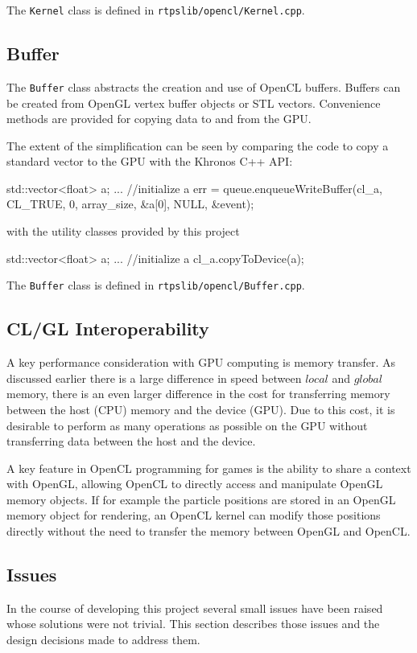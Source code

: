 The \verb|Kernel| class is defined in \verb|rtpslib/opencl/Kernel.cpp|.


\subsection{Buffer}

The \verb|Buffer| class abstracts the creation and use of OpenCL buffers.
Buffers can be created from OpenGL vertex buffer objects or STL vectors.
Convenience methods are provided for copying data to and from the GPU.

The extent of the simplification can be seen by comparing the code to copy a
standard vector to the GPU with the Khronos C++ API:
\begin{cppcode}{0}
     std::vector<float> a; 
     ... //initialize a 
     err = queue.enqueueWriteBuffer(cl_a, CL_TRUE, 0, array_size, &a[0], NULL, 
         &event);
\end{cppcode}

with the utility classes provided by this project
\begin{cppcode}{0}
    std::vector<float> a; 
     ... //initialize a 
    cl_a.copyToDevice(a);
\end{cppcode}


The \verb|Buffer| class is defined in \verb|rtpslib/opencl/Buffer.cpp|.


\subsection{CL/GL Interoperability}
A key performance consideration with GPU computing is memory transfer. As
discussed earlier there is a large difference in speed between $local$ and $global$
memory, there is an even larger difference in the cost for transferring memory
between the host (CPU) memory and the device (GPU). Due to this cost, it is
desirable to perform as many operations as possible on the GPU without
transferring data between the host and the device.


A key feature in OpenCL programming for games is the ability to share a
context with OpenGL, allowing OpenCL to directly access and manipulate OpenGL
memory objects. If for example the particle positions are stored in an OpenGL
memory object for rendering, an OpenCL kernel can modify those positions
directly without the need to transfer the memory between OpenGL and OpenCL.



\subsection{Issues}
In the course of developing this project several small issues have been raised
whose solutions were not trivial. This section describes those issues and the
design decisions made to address them.

